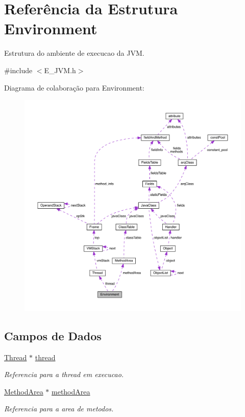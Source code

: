 \hypertarget{struct_environment}{}\section{Referência da Estrutura Environment}
\label{struct_environment}


Estrutura do ambiente de execucao da J\+V\+M.  




{\ttfamily \#include $<$E\+\_\+\+J\+V\+M.\+h$>$}



Diagrama de colaboração para Environment\+:
\nopagebreak
\begin{figure}[H]
\begin{center}
\leavevmode
\includegraphics[width=350pt]{struct_environment__coll__graph}
\end{center}
\end{figure}
\subsection*{Campos de Dados}
\begin{DoxyCompactItemize}
\item 
\hyperlink{struct_thread}{Thread} $\ast$ \hyperlink{struct_environment_a9521ae1091a45875768bdbbe0a339014}{thread}
\begin{DoxyCompactList}\small\item\em Referencia para a thread em execucao. \end{DoxyCompactList}\item 
\hyperlink{struct_method_area}{Method\+Area} $\ast$ \hyperlink{struct_environment_a1c73c41c6c38e7e67ea22f6d59044852}{method\+Area}
\begin{DoxyCompactList}\small\item\em Referencia para a area de metodos. \end{DoxyCompactList}\end{DoxyCompactItemize}


